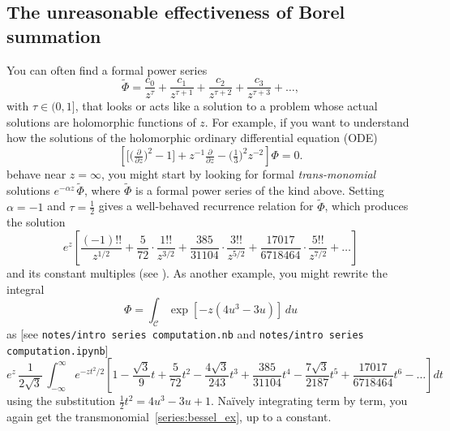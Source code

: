 \documentclass{article}
\newcommand{\series}[1]{\tilde{#1}}
\theoremstyle{definition}
\theoremstyle{plain}
\newenvironment{verify}{\color{ForestGreen}}{\color{black}}
\begin{document}
\subsection{The unreasonable effectiveness of Borel summation}\label{intro:summation}
You can often find a formal power series %
\[ \series{\Phi} = \frac{c_0}{z^\tau} + \frac{c_1}{z^{\tau+1}} + \frac{c_2}{z^{\tau+2}} + \frac{c_3}{z^{\tau+3}} + \ldots, \]
with $\tau \in (0, 1]$, that looks or acts like a solution to a problem whose actual solutions are holomorphic functions of $z$. For example, if you want to understand how the solutions of the holomorphic ordinary differential equation (ODE)
\begin{equation}
\left[ \big[ \big(\tfrac{\partial}{\partial z}\big)^2 - 1 \big] + z^{-1} \tfrac{\partial}{\partial z} - \big(\tfrac{1}{3}\big)^2 z^{-2} \right] \Phi= 0. \label{eqn:bessel_rescaled_ex}
\end{equation}
behave near $z = \infty$, you might start by looking for formal {\em trans-monomial} solutions $e^{-\alpha z}\,\series{\Phi}$, where $\series{\Phi}$ is a formal power series of the kind above. Setting $\alpha = -1$ and $\tau = \tfrac{1}{2}$ gives a well-behaved recurrence relation for $\series{\Phi}$, which produces the solution 
\begin{equation}
e^{z} \left[ \frac{(-1)!!}{z^{1/2}} + \frac{5}{72} \cdot \frac{1!!}{z^{3/2}} + \frac{385}{31104} \cdot \frac{3!!}{z^{5/2}} + \frac{17017}{6718464} \cdot \frac{5!!}{z^{7/2}} + \ldots \right] \label{series:bessel_ex}
\end{equation}
and its constant multiples (see \cite[equation 10.40.1]{dlmf}). As another example, you might rewrite the integral
\begin{equation}\label{int:bessel_ex}
\Phi = \int_{\mathcal{C}} \exp\left[-z \left(4 u^3 - 3 u\right)\right]\,du
\end{equation}
as \begin{verify}[see \texttt{notes/intro series computation.nb} and \texttt{notes/intro series computation.ipynb}]\end{verify}
\[ e^{z}\, \frac{1}{2\sqrt{3}}\, \int_{-\infty}^\infty e^{-z t^2/2} \left[ 1 - \frac{\sqrt{3}}{9} t + \frac{5}{72} t^2 - \frac{4\sqrt{3}}{243} t^3 + \frac{385}{31104} t^4 - \frac{7\sqrt{3}}{2187} t^5 + \frac{17017}{6718464} t^6 - \ldots \right] dt \]
using the substitution $\tfrac{1}{2} t^2 = 4u^3 - 3u + 1$. Na\"{i}vely integrating term by term, you again get the transmonomial~\eqref{series:bessel_ex}, up to a constant.
\end{document}
